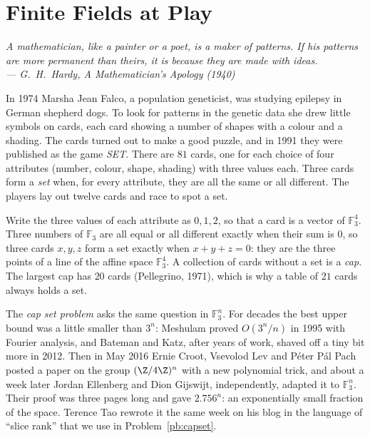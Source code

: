 \chapter{Finite Fields at Play}

\begin{center}\itshape
A mathematician, like a painter or a poet, is a maker of patterns. If his patterns are more permanent than theirs, it is
because they are made with ideas.\\
\upshape --- G.~H.~Hardy, \emph{A Mathematician's Apology} (1940)
\end{center}

In 1974 Marsha Jean Falco, a population geneticist, was studying epilepsy in German shepherd dogs. To look for patterns in the
genetic data she drew little symbols on cards, each card showing a number of shapes with a colour and a shading. The cards
turned out to make a good puzzle, and in 1991 they were published as the game \emph{SET}. There are $81$ cards, one for each choice of four attributes
(number, colour, shape, shading) with three values each. Three cards form a \emph{set} when, for every attribute, they are all
the same or all different. The players lay out twelve cards and race to spot a set.

Write the three values of each attribute as $0,1,2$, so that a card is a vector of $\mathbb F_3^4$. Three numbers of $\mathbb F_3$
are all equal or all different exactly when their sum is $0$, so three cards $x,y,z$ form a set exactly when $x+y+z=0$: they
are the three points of a line of the affine space $\mathbb F_3^4$. A collection of cards without a set is a \emph{cap}. The
largest cap has $20$ cards (Pellegrino, 1971), which is why a table of $21$ cards always holds a set.

The \emph{cap set problem} asks the same question in $\mathbb F_3^n$. For decades the best upper bound was a little smaller than
$3^n$: Meshulam proved $O(3^n/n)$ in 1995 with Fourier analysis, and Bateman and Katz, after years of work, shaved off a tiny bit
more in 2012. Then in May 2016 Ernie Croot, Vsevolod Lev and Péter Pál Pach posted a paper on the group $(\Z/4\Z)^n$ with a new
polynomial trick, and about a week later Jordan Ellenberg and Dion Gijswijt, independently, adapted it to $\mathbb F_3^n$. Their proof
was three pages long and gave $2.756^n$: an exponentially small fraction of the space. Terence Tao rewrote it the same week on
his blog in the language of ``slice rank'' that we use in Problem~\ref{pb:capset}.

